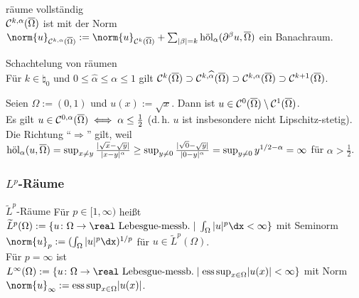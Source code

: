 \begin{Satz}{räume vollständig}\\
    $\C^{k,\alpha}(\overline{\Omega})$ ist mit der Norm
    $\norm{u}_{\C^{k,\alpha}(\overline{\Omega})} :=
    \norm{u}_{\C^k(\overline{\Omega})} +
    \sum_{|\beta|=k} \hol_\alpha(\partial^\beta u, \overline{\Omega})$
    ein Banachraum.
\end{Satz}

\begin{Satz}{Schachtelung von räumen}\\
    Für $k \in \natural_0$ und $0 \le \widehat{\alpha} \le \alpha \le 1$ gilt
    $\C^k(\overline{\Omega}) \supset \C^{k,\widehat{\alpha}}(\overline{\Omega}) \supset
    \C^{k,\alpha}(\overline{\Omega}) \supset \C^{k+1}(\overline{\Omega})$.
\end{Satz}

\begin{Bsp}
    Seien $\Omega := (0, 1)$ und $u(x) := \sqrt{x}$.
    Dann ist $u \in \C^0(\overline{\Omega}) \setminus \C^1(\overline{\Omega})$.\\
    Es gilt $u \in \C^{0,\alpha}(\overline{\Omega}) \iff \alpha \le \frac{1}{2}$
    (d.\,h. $u$ ist insbesondere nicht Lipschitz-stetig).\\
    Die Richtung "`$\Rightarrow$"' gilt, weil\\
    $\hol_\alpha(u, \overline{\Omega})
    = \sup_{x \not= y} \frac{|\sqrt{x} - \sqrt{y}|}{|x - y|^\alpha}
    \ge \sup_{y \not= 0} \frac{|\sqrt{0} - \sqrt{y}|}{|0 - y|^\alpha} =
    \sup_{y \not = 0} y^{1/2-\alpha} = \infty$ für $\alpha > \frac{1}{2}$.
\end{Bsp}

\pagebreak

\subsubsection{%
    \texorpdfstring{$L^p$}{Lp}-Räume%
}

\begin{Def}{$\widetilde{L}^p$-Räume}
    Für $p \in [1, \infty)$ heißt
    $\widetilde{L}^p(\Omega) :=
    \{\text{$u\colon \Omega \to \real$ Lebesgue-messb.} \;|\; \int_\Omega |u|^p \dx < \infty\}$
    mit Seminorm $\norm{u}_p := (\int_\Omega |u|^p \dx)^{1/p}$ für
    $u \in \widetilde{L}^p(\Omega)$.\\
    Für $p = \infty$ ist $L^\infty(\Omega) :=
    \{\text{$u\colon \Omega \to \real$ Lebesgue-messb.} \;|\;
    \esssup_{x \in \Omega} |u(x)| < \infty\}$
    mit Norm $\norm{u}_\infty := \esssup_{x \in \Omega} |u(x)|$.
\end{Def}

